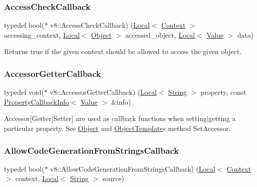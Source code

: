 \subsubsection{\texorpdfstring{Access\+Check\+Callback}{AccessCheckCallback}}
{\footnotesize\ttfamily typedef bool($\ast$ v8\+::\+Access\+Check\+Callback) (\mbox{\hyperlink{classv8_1_1Local}{Local}}$<$ \mbox{\hyperlink{classv8_1_1Context}{Context}} $>$ accessing\+\_\+context, \mbox{\hyperlink{classv8_1_1Local}{Local}}$<$ \mbox{\hyperlink{classv8_1_1Object}{Object}} $>$ accessed\+\_\+object, \mbox{\hyperlink{classv8_1_1Local}{Local}}$<$ \mbox{\hyperlink{classv8_1_1Value}{Value}} $>$ data)}

Returns true if the given context should be allowed to access the given object. \mbox{\label{namespacev8_a722613c87061708a4f1aa050d095f868}} 
\subsubsection{\texorpdfstring{Accessor\+Getter\+Callback}{AccessorGetterCallback}}
{\footnotesize\ttfamily typedef void($\ast$ v8\+::\+Accessor\+Getter\+Callback) (\mbox{\hyperlink{classv8_1_1Local}{Local}}$<$ \mbox{\hyperlink{classv8_1_1String}{String}} $>$ property, const \mbox{\hyperlink{classv8_1_1PropertyCallbackInfo}{Property\+Callback\+Info}}$<$ \mbox{\hyperlink{classv8_1_1Value}{Value}} $>$ \&info)}

Accessor\mbox{[}Getter$\vert$\+Setter\mbox{]} are used as callback functions when setting$\vert$getting a particular property. See \mbox{\hyperlink{classv8_1_1Object}{Object}} and \mbox{\hyperlink{classv8_1_1ObjectTemplate}{Object\+Template}}\textquotesingle{}s method Set\+Accessor. \mbox{\label{namespacev8_ab2c5378d97ebe2885b300fe0bcd3f89c}} 
\subsubsection{\texorpdfstring{Allow\+Code\+Generation\+From\+Strings\+Callback}{AllowCodeGenerationFromStringsCallback}}
{\footnotesize\ttfamily typedef bool($\ast$ v8\+::\+Allow\+Code\+Generation\+From\+Strings\+Callback) (\mbox{\hyperlink{classv8_1_1Local}{Local}}$<$ \mbox{\hyperlink{classv8_1_1Context}{Context}} $>$ context, \mbox{\hyperlink{classv8_1_1Local}{Local}}$<$ \mbox{\hyperlink{classv8_1_1String}{String}} $>$ source)}

